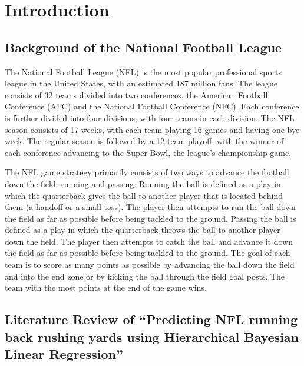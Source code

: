 \documentclass[
  super,
  preprint,
  3p]{elsarticle}
\begin{document}
\hypertarget{introduction}{%
\section{Introduction}\label{introduction}}

\hypertarget{background-of-the-national-football-league}{%
\subsection{Background of the National Football
League}\label{background-of-the-national-football-league}}

The National Football League (NFL) is the most popular professional
sports league in the United States, with an estimated 187 million fans.
The league consists of 32 teams divided into two conferences, the
American Football Conference (AFC) and the National Football Conference
(NFC). Each conference is further divided into four divisions, with four
teams in each division. The NFL season consists of 17 weeks, with each
team playing 16 games and having one bye week. The regular season is
followed by a 12-team playoff, with the winner of each conference
advancing to the Super Bowl, the league's championship game.

The NFL game strategy primarily consists of two ways to advance the
football down the field: running and passing. Running the ball is
defined as a play in which the quarterback gives the ball to another
player that is located behind them (a handoff or a small toss). The
player then attempts to run the ball down the field as far as possible
before being tackled to the ground. Passing the ball is defined as a
play in which the quarterback throws the ball to another player down the
field. The player then attempts to catch the ball and advance it down
the field as far as possible before being tackled to the ground. The
goal of each team is to score as many points as possible by advancing
the ball down the field and into the end zone or by kicking the ball
through the field goal posts. The team with the most points at the end
of the game wins.

\hypertarget{literature-review-of-predicting-nfl-running-back-rushing-yards-using-hierarchical-bayesian-linear-regression}{%
\subsection{Literature Review of ``Predicting NFL running back rushing
yards using Hierarchical Bayesian Linear
Regression''}\label{literature-review-of-predicting-nfl-running-back-rushing-yards-using-hierarchical-bayesian-linear-regression}}
\end{document}
